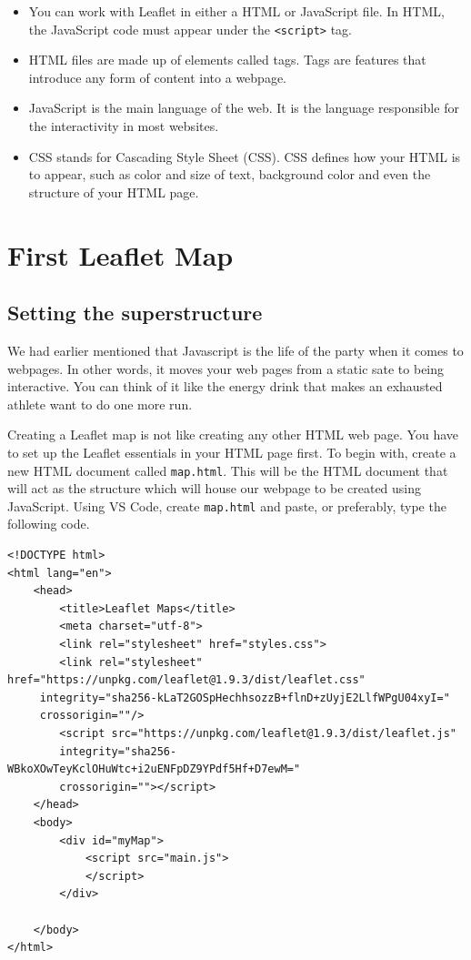 \documentclass[
]{book}
\begin{document}
\begin{itemize}
\item
  You can work with Leaflet in either a HTML or JavaScript file. In HTML,
  the JavaScript code must appear under the \texttt{\textless{}script\textgreater{}} tag.
\item
  HTML files are made up of elements called tags. Tags are features that introduce any form of content into a webpage.
\item
  JavaScript is the main language of the web. It is the language responsible for the interactivity in most websites.
\item
  CSS stands for Cascading Style Sheet (CSS). CSS defines how your HTML is to appear, such as color and size of text, background color and even the structure of your HTML page.
\end{itemize}

\hypertarget{first-leaflet-map}{%
\chapter{First Leaflet Map}\label{first-leaflet-map}}

\hypertarget{setting-the-superstructure}{%
\section{Setting the superstructure}\label{setting-the-superstructure}}

We had earlier mentioned that Javascript is the life of the party when it comes to webpages. In other words, it moves your web pages from a static sate to being interactive. You can think of it like the energy drink that makes an exhausted athlete want to do one more run.

Creating a Leaflet map is not like creating any other HTML web page. You have to set up the Leaflet essentials in your HTML page first. To begin with, create a new HTML document called \texttt{map.html}. This will be the HTML document that will act as the structure which will house our webpage to be created using JavaScript. Using VS Code, create \texttt{map.html} and paste, or preferably, type the following code.

\begin{verbatim}
<!DOCTYPE html>
<html lang="en">
    <head>
        <title>Leaflet Maps</title>
        <meta charset="utf-8">
        <link rel="stylesheet" href="styles.css">
        <link rel="stylesheet" href="https://unpkg.com/leaflet@1.9.3/dist/leaflet.css"
     integrity="sha256-kLaT2GOSpHechhsozzB+flnD+zUyjE2LlfWPgU04xyI="
     crossorigin=""/>
        <script src="https://unpkg.com/leaflet@1.9.3/dist/leaflet.js"
        integrity="sha256-WBkoXOwTeyKclOHuWtc+i2uENFpDZ9YPdf5Hf+D7ewM="
        crossorigin=""></script>
    </head>
    <body>
        <div id="myMap">
            <script src="main.js">
            </script> 
        </div>  
        
    </body>
</html>
\end{verbatim}
\end{document}
